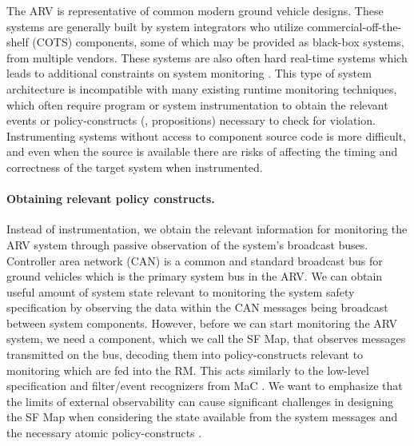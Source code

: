 The ARV is representative of common modern ground vehicle designs. These systems are generally built by system integrators who utilize commercial-off-the-shelf (COTS) components, some of which may be provided as black-box systems, from multiple vendors.
These systems are also often hard real-time systems which leads to additional constraints on system monitoring \cite{Goodloe2010}. 
This type of system architecture is incompatible with many existing runtime monitoring techniques, which often require program or system instrumentation \cite{Havelund2004, Chen2003, Bonakdarpour2012,Kim2004} to obtain the relevant events or policy-constructs (\eg, propositions) necessary to check for violation. 
Instrumenting systems without access to component source code is more difficult, and even when the source is available there are risks of affecting the timing and correctness of the target system when instrumented.

\paragraph{Obtaining relevant policy constructs.}
Instead of instrumentation, we obtain the relevant information for monitoring the ARV system through passive observation of the system's broadcast buses. 
Controller area network (CAN) is a common and standard broadcast bus for ground vehicles which is the primary system bus in the ARV. We can obtain useful amount of system state relevant to monitoring the system safety specification by observing the data within the CAN messages being broadcast between system components.
However, before we can start monitoring the ARV system, we need a component, which we call the \textsf{SF Map}, that observes messages transmitted on the bus, decoding them into policy-constructs relevant to monitoring which are fed into the RM. 
This acts similarly to the low-level specification and filter/event recognizers from MaC \cite{Kim2004}.
We want to emphasize that the limits of external observability can cause significant challenges  in designing the \textsf{SF Map} when considering the state available from the system messages and the necessary atomic policy-constructs \cite{Kane2014}.

